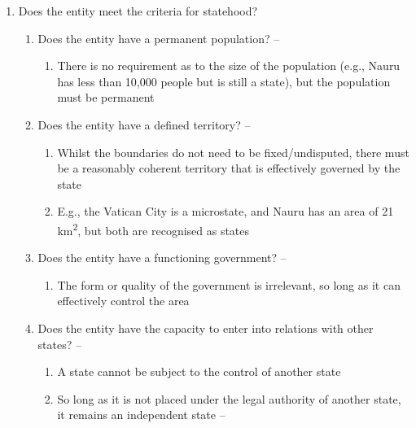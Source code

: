 \begin{enumerate}
    \item Does the entity meet the criteria for statehood?
    \begin{enumerate}
        \item Does the entity have a permanent population? -- 
        \begin{enumerate}
            \item There is no requirement as to the size of the population (e.g., Nauru has less than 10,000 people but is still a state), but the population must be permanent
        \end{enumerate}
        \item Does the entity have a defined territory? -- 
        \begin{enumerate}
            \item Whilst the boundaries do not need to be fixed/undisputed, there must be a reasonably coherent territory that is effectively governed by the state
            \item E.g., the Vatican City is a microstate, and Nauru has an area of 21 km\textsuperscript{2}, but both are recognised as states
        \end{enumerate}
        \item Does the entity have a functioning government? -- 
        \begin{enumerate}
            \item The form or quality of the government is irrelevant, so long as it can effectively control the area
        \end{enumerate}
        \item Does the entity have the capacity to enter into relations with other states? -- 
        \begin{enumerate}
            \item A state cannot be subject to the control of another state
            \item So long as it is not placed under the legal authority of another state, it remains an independent state -- 
        \end{enumerate}

\end{enumerate}
\end{enumerate}
